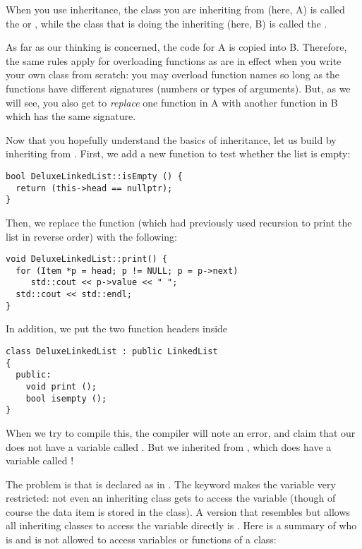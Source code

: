 When you use inheritance, the class you are inheriting from (here, A) is
called the  or , while the class
that is doing the inheriting (here, B) is called the .

As far as our thinking is concerned, the code for A is copied into B.
Therefore, the same rules apply for overloading functions as are in
effect when you write your own class from scratch:
you may overload function names so long as the functions have
different signatures (numbers or types of arguments).
But, as we will see, you also get to \emph{replace} one function in A
with another function in B which has the same signature.

Now that you hopefully understand the basics of inheritance, 
let us build  by inheriting from
. 
First, we add a new function to test whether the list is empty:

\begin{verbatim}
bool DeluxeLinkedList::isEmpty () {
  return (this->head == nullptr);
}
\end{verbatim}

Then, we replace the  function (which had previously used
recursion to print the list in reverse order) with the following:

\begin{verbatim}
void DeluxeLinkedList::print() {
  for (Item *p = head; p != NULL; p = p->next)
     std::cout << p->value << " ";
  std::cout << std::endl;
}
\end{verbatim}

In addition, we put the two function headers inside 
\begin{verbatim}
class DeluxeLinkedList : public LinkedList
{
  public:
    void print ();
    bool isempty ();
}
\end{verbatim}

When we try to compile this, the compiler will note an error,
and claim that our  does not have a variable
called .
But we inherited from ,
which does have a variable called !

The problem is that  is declared as  in
. The keyword  makes the variable
very restricted: not even an inheriting class gets to access the
variable (though of course the data item is stored in the class).
A version that resembles  but allows all inheriting
classes to access the variable directly is .
Here is a summary of who is and is not allowed to access variables or
functions of a class:

